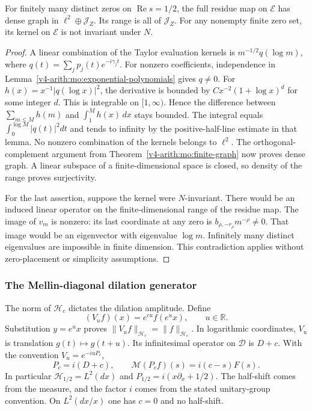 \begin{proposition}
\label{v4-arith:mo:occupation-jet-graph}
For finitely many distinct zeros on $\operatorname{Re}s=1/2$,
the full residue map on $\mathscr E$ has dense graph in
$\ell^2\oplus\mathscr J_Z$. Its range is all of $\mathscr J_Z$.
For any nonempty finite zero set, its kernel on $\mathscr E$
is not invariant under $N$.
\end{proposition}
\begin{proof}
A linear combination of the Taylor evaluation kernels is
$m^{-1/2}q(\log m)$, where
$q(t)=\sum_jp_j(t)e^{-i\gamma_jt}$. For nonzero coefficients,
independence in Lemma~\ref{v4-arith:mo:exponential-polynomials} gives $q\ne0$.
For $h(x)=x^{-1}|q(\log x)|^2$, the derivative is bounded by
$Cx^{-2}(1+\log x)^d$ for some integer $d$.
This is integrable on $[1,\infty)$. Hence the difference between
$\sum_{m\leq M}h(m)$ and $\int_1^M h(x)\,dx$ stays bounded.
The integral equals $\int_0^{\log M}|q(t)|^2dt$ and tends to
infinity by the positive-half-line estimate in that lemma.
No nonzero combination of the kernels belongs to $\ell^2$.
The orthogonal-complement argument from Theorem~\ref{v4-arith:mo:finite-graph}
now proves dense graph. A linear subspace of a finite-dimensional
space is closed, so density of the range proves surjectivity.

For the last assertion, suppose the kernel were $N$-invariant.
There would be an induced linear operator on the finite-dimensional
range of the residue map. The image of $v_m$ is nonzero: its
last coordinate at any zero is
$b_{\rho,-r_\rho}m^{-\rho}\ne0$.
That image would be an eigenvector with eigenvalue $\log m$.
Infinitely many distinct eigenvalues are impossible in finite
dimension. This contradiction applies without zero-placement
or simplicity assumptions.
\end{proof}

\subsubsection{The Mellin-diagonal dilation generator}

The norm of $\mathscr H_c$ dictates the dilation amplitude. Define
\[
 (V_uf)(x)=e^{cu}f(e^u x),\qquad u\in\mathbb R.
\]
Substitution $y=e^u x$ proves $\|V_uf\|_{\mathscr H_c}=
\|f\|_{\mathscr H_c}$. In logarithmic coordinates, $V_u$ is
translation $g(t)\mapsto g(t+u)$. Its infinitesimal operator on
$\mathscr D$ is $D+c$. With the convention $V_u=e^{-iuP_c}$,
\begin{equation}
 P_c=i(D+c),\qquad
 \mathcal M(P_cf)(s)=i(c-s)F(s).
 \label{v4-arith:mo:dilation}
\end{equation}
In particular $\mathscr H_{1/2}=L^2(dx)$ and
$P_{1/2}=i(x\partial_x+1/2)$. The half-shift comes from the
measure, and the factor $i$ comes from the stated unitary-group
convention. On $L^2(dx/x)$ one has $c=0$ and no half-shift.

